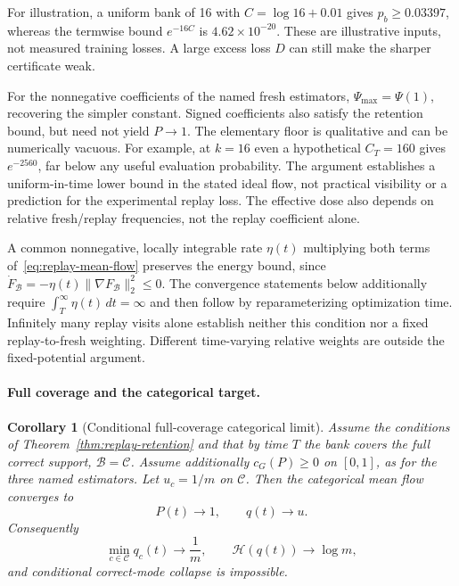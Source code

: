 \documentclass{article}
\newcommand{\enforcehalffinalproseline}{%
  \setlength{\parfillskip}{0pt plus .20\linewidth}}
\newcommand{\1}{\mathbf 1}
\newtheorem{corollary}[lemma]{Corollary}
\theoremstyle{remark}
\theoremstyle{definition}
\theoremstyle{plain}
\begin{document}
For illustration, a uniform bank of 16 with $C=\log16+0.01$ gives
$p_b\ge0.03397$, whereas the termwise bound $e^{-16C}$ is
$4.62\times10^{-20}$. These are illustrative inputs, not measured training
losses. A large excess loss $D$ can still make the sharper certificate weak.



For the nonnegative coefficients of the named fresh estimators,
$\Psi_{\max}=\Psi(1)$, recovering the simpler constant. Signed coefficients
also satisfy the retention bound, but need not yield $P\to1$.
The elementary floor is qualitative and can be numerically vacuous. For example, at
$k=16$ even a hypothetical $C_T=160$ gives $e^{-2560}$, far below any useful
evaluation probability. The argument establishes a uniform-in-time lower
bound in the stated ideal flow, not practical visibility or a prediction for
the experimental replay loss. The effective dose also depends on relative
fresh/replay frequencies, not the replay coefficient alone.

A common nonnegative, locally integrable rate $\eta(t)$ multiplying both
terms of~\eqref{eq:replay-mean-flow} preserves the energy bound, since
$\dot F_{\mathcal B}=-\eta(t)\|\nabla F_{\mathcal B}\|_2^2\le0$.
The convergence statements below additionally require
$\int_T^\infty\eta(t)\,dt=\infty$ and then follow by reparameterizing
optimization time. Infinitely many replay visits alone establish neither
this condition nor a fixed replay-to-fresh weighting. Different time-varying
relative weights are outside the fixed-potential argument.

\paragraph{Full coverage and the categorical target.}
\begin{corollary}[Conditional full-coverage categorical limit]
\enforcehalffinalproseline
\label{cor:replay-no-collapse}
Assume the conditions of Theorem~\ref{thm:replay-retention} and that by time
$T$ the bank covers the full correct support, $\mathcal B=\mathcal C$.
Assume additionally $c_G(P)\ge0$ on $[0,1]$, as for the three named
estimators. Let
$u_c=1/m$ on $\mathcal C$. Then the categorical mean flow converges to
\[
  P(t)\longrightarrow1,
  \qquad q(t)\longrightarrow u.
\]
Consequently
\[
  \min_{c\in\mathcal C}q_c(t)\longrightarrow\frac1m,
  \qquad
  \mathcal H(q(t))\longrightarrow\log m,
\]
and conditional correct-mode collapse is impossible.
\end{corollary}
\end{document}
